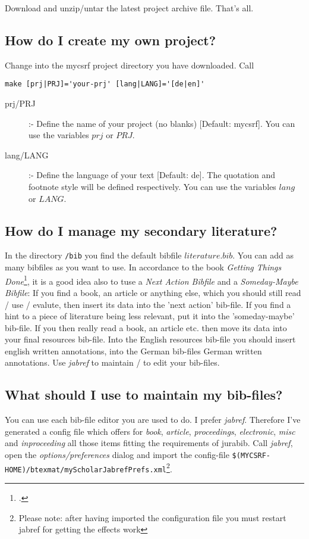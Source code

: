 \documentclass[
  DIV=calc,
  BCOR=5mm,
  11pt,
  headings=small,
  oneside,
  abstract=true,
  toc=bib,
  ngerman,english]{scrartcl}
\begin{document}
Download and unzip/untar the latest project archive file. That's all.

\subsection{How do I create my own project?}

Change into the mycsrf project directory you have downloaded. Call
\begin{verbatim}
make [prj|PRJ]='your-prj' [lang|LANG]='[de|en]'
\end{verbatim}

\begin{description}	
  \item [prj/PRJ] :- Define the name of your project (no blanks) [Default: mycsrf]. 
  You can use the variables $prj$ or $PRJ$.
  \item [lang/LANG] :- Define the language of your text [Default: de]. The quotation
  and footnote style will be defined respectively. You can use the variables 
  $lang$ or $LANG$.
\end{description}

\subsection{How do I manage my secondary literature?}
In the directory \texttt{/bib} you find the default bibfile $literature.bib$.
You can add as many bibfiles as you want to use. In accordance to the book
\textit{Getting Things Done}\footcite[cf.][36 et passim]{Allen2001a}, it is a
good idea also to tuse a \textit{Next Action Bibfile} and a
\textit{Someday-Maybe Bibfile}: If you find a book, an article or anything else,
which you should still read / use / evalute, then insert its data into the 'next
action' bib-file. If you find a hint to a piece of literature being less
relevant, put it into the 'someday-maybe' bib-file. If you then really read a
book, an article etc. then move its data into your final resources bib-file.
Into the English resources bib-file you should insert english written
annotations, into the German bib-files German written annotations. Use
\textit{jabref} to maintain / to edit your bib-files.

\subsection{What should I use to maintain my bib-files?}
You can use each bib-file editor you are used to do. I prefer \textit{jabref}.
There\-fo\-re I've generated a config file which offers for \textit{book},
\textit{article}, \textit{proceedings}, \textit{elec\-tro\-nic}, \textit{misc}
and \textit{inproceeding} all those items fitting the requirements of jurabib. Call
\textit{jabref}, open the \textit{options/preferences} dialog and import the
config-file
\texttt{\$(MYCSRF-HOME)/btexmat/myScholarJabrefPrefs.xml}\footnote{Please
note: after having imported the configuration file you must restart jabref for
getting the effects work}.
\end{document}
